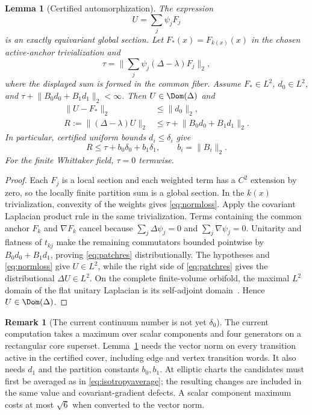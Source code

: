 \documentclass[11pt]{amsart}
\newtheorem{lemma}[theorem]{Lemma}
\theoremstyle{definition}
\newtheorem{remark}[theorem]{Remark}
\newcommand{\norm}[1]{\lVert #1\rVert}
\newcommand{\D}{\Delta}
\begin{document}
\begin{lemma}[Certified automorphization]\label{lem:patch}
The expression
\[
 U=\sum_j\psi_jF_j
\]
is an exactly equivariant global section. Let $F_*(x)=F_{k(x)}(x)$ in the
chosen active-anchor trivialization and
\[
 \tau=\norm{\sum_j\psi_j(\D-\lambda)F_j}_2,
\]
where the displayed sum is formed in the common fiber. Assume
$F_*\in L^2$, $d_0\in L^2$, and
$\tau+\norm{B_0d_0+B_1d_1}_2<\infty$. Then $U\in\Dom(\D)$ and
\begin{align}
 \norm{U-F_*}_2&\le\norm{d_0}_2,\label{eq:normloss}\\
 R:=\norm{(\D-\lambda)U}_2
 &\le\tau+\norm{B_0d_0+B_1d_1}_2.\label{eq:patchres}
\end{align}
In particular, certified uniform bounds $d_i\le\delta_i$ give
\begin{equation}\label{eq:patchsup}
 R\le\tau+b_0\delta_0+b_1\delta_1,\qquad
 b_i=\norm{B_i}_2.
\end{equation}
For the finite Whittaker field, $\tau=0$ termwise.
\end{lemma}

\begin{proof}
Each $F_j$ is a local section and each weighted term has a $C^2$ extension
by zero, so the locally finite partition sum is a global section. In the
$k(x)$ trivialization, convexity of the weights gives
\eqref{eq:normloss}. Apply the covariant Laplacian product rule in the same
trivialization. Terms containing the common anchor $F_k$ and $\nabla F_k$
cancel because $\sum_j\D\psi_j=0$ and
$\sum_j\nabla\psi_j=0$. Unitarity and flatness of $t_{kj}$ make the
remaining commutators bounded pointwise by $B_0d_0+B_1d_1$, proving
\eqref{eq:patchres} distributionally. The hypotheses and
\eqref{eq:normloss} give $U\in L^2$, while the right side of
\eqref{eq:patchres} gives the distributional $\D U\in L^2$. On the complete
finite-volume orbifold, the maximal $L^2$ domain of the flat unitary
Laplacian is its self-adjoint
domain~\cite[Remark~3.14]{BallmannPolymerakis}. Hence $U\in\Dom(\D)$.
\end{proof}

\begin{remark}[The current continuum number is not yet $\delta_0$]
The current computation takes a maximum over scalar components and four
generators on a rectangular core superset. Lemma~\ref{lem:patch} needs the
vector norm on every transition active in the certified cover, including
edge and vertex transition words. It also needs $d_1$ and the partition
constants $b_0,b_1$. At elliptic charts the candidates must first be averaged
as in \eqref{eq:isotropyaverage}; the resulting changes are included in the
same value and covariant-gradient defects. A scalar component maximum costs
at most $\sqrt6$ when converted to the vector norm.
\end{remark}
\end{document}
